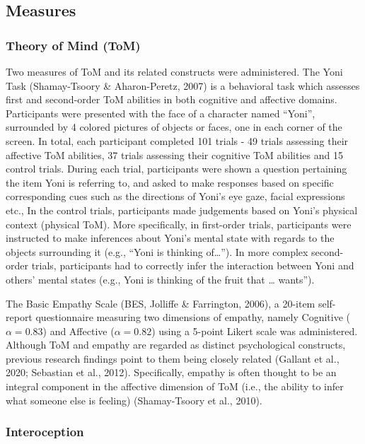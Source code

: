 \documentclass[
  man,mask,floatsintext]{apa6}
\begin{document}
\hypertarget{measures}{%
\subsection{Measures}\label{measures}}

\hypertarget{theory-of-mind-tom}{%
\subsubsection{Theory of Mind (ToM)}\label{theory-of-mind-tom}}

Two measures of ToM and its related constructs were administered. The Yoni Task (Shamay-Tsoory \& Aharon-Peretz, 2007) is a behavioral task which assesses first and second-order ToM abilities in both cognitive and affective domains. Participants were presented with the face of a character named ``Yoni'', surrounded by 4 colored pictures of objects or faces, one in each corner of the screen. In total, each participant completed 101 trials - 49 trials assessing their affective ToM abilities, 37 trials assessing their cognitive ToM abilities and 15 control trials. During each trial, participants were shown a question pertaining the item Yoni is referring to, and asked to make responses based on specific corresponding cues such as the directions of Yoni's eye gaze, facial expressions etc., In the control trials, participants made judgements based on Yoni's physical context (physical ToM). More specifically, in first-order trials, participants were instructed to make inferences about Yoni's mental state with regards to the objects surrounding it (e.g., ``Yoni is thinking of\ldots{}''). In more complex second-order trials, participants had to correctly infer the interaction between Yoni and others' mental states (e.g., Yoni is thinking of the fruit that \ldots{} wants'').

The Basic Empathy Scale (BES, Jolliffe \& Farrington, 2006), a 20-item self-report questionnaire measuring two dimensions of empathy, namely Cognitive (\(\alpha = 0.83\)) and Affective (\(\alpha = 0.82\)) using a 5-point Likert scale was administered. Although ToM and empathy are regarded as distinct psychological constructs, previous research findings point to them being closely related (Gallant et al., 2020; Sebastian et al., 2012). Specifically, empathy is often thought to be an integral component in the affective dimension of ToM (i.e., the ability to infer what someone else is feeling) (Shamay-Tsoory et al., 2010).

\hypertarget{interoception}{%
\subsubsection{Interoception}\label{interoception}}
\end{document}
